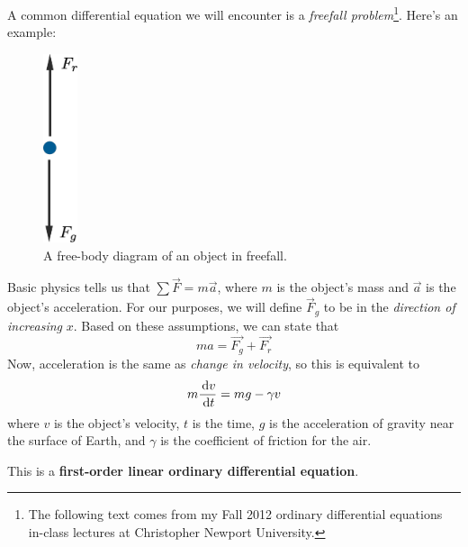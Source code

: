 A common differential equation we will encounter is a \emph{freefall problem}\footnote{The following text comes from my Fall 2012 ordinary differential equations in-class lectures at Christopher Newport University.}.
Here's an example:

\begin{figure}[H]
  \begin{center}
    \includegraphics[width=1cm]{continuous/ode/freefall.eps}
  \end{center}
  \caption{A free-body diagram of an object in freefall.}
  \label{fig:freefall}
\end{figure}

Basic physics tells us that $\sum \vec F = m\vec a$,
where $m$ is the object's mass and $\vec{a}$ is the object's acceleration.
For our purposes, we will define $\vec F_g$ to be in the \emph{direction of increasing\/} $x$.
Based on these assumptions, we can state that
\[
  ma=\vec{F_g}+\vec{F_r}
  \]
Now, acceleration is the same as \emph{change in velocity}, so this is equivalent to
\[
  m\frac{\,\mathrm{d} v}{\,\mathrm{d} t}=mg - \gamma v
  \]
where $v$ is the object's velocity, $t$ is the time, $g$ is the acceleration of gravity near the surface of Earth, and $\gamma$ is the coefficient of friction for the air.

This is a \textbf{first-order linear ordinary differential equation}.

